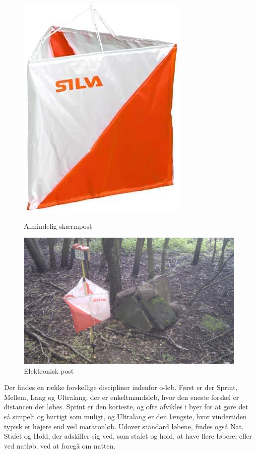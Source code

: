 \begin{figure}
	\centering
	\begin{minipage}{.5\textwidth}
		\centering
		\includegraphics[width=.5\linewidth]{billeder/o-skaerm}
		\caption{Almindelig skærmpost}
		\label{fig:test1}
	\end{minipage}%
	\begin{minipage}{.5\textwidth}
		\centering
		\includegraphics[width=1.0\linewidth]{billeder/banelaeggerkreativitet}
		\caption{Elektronisk post}
		\label{fig:test2}
	\end{minipage}
\end{figure}

Der findes en række forskellige discipliner indenfor o-løb. Først er der Sprint, Mellem, Lang og  Ultralang, der er enkeltmandsløb, hvor den eneste forskel er distancen der løbes. Sprint er den korteste, og ofte afvikles i byer for at gøre det så simpelt og hurtigt som muligt, og Ultralang er den længste, hvor vindertiden typisk er højere end ved maratonløb. Udover standard løbene, findes også Nat, Stafet og Hold, der adskiller sig ved, som stafet og hold, at have flere løbere, eller ved natløb, ved at foregå om natten. 


